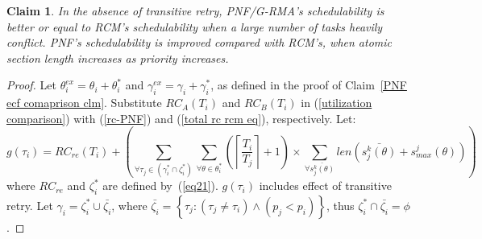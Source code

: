 \documentclass[12pt,english]{report}
\newtheorem{clm}{Claim}
\newtheorem{proof}{Proof}
\begin{document}
\begin{clm}\label{clm_pnf_rcm_comp}
In the absence of transitive retry, PNF/G-RMA's schedulability is better or equal to RCM's schedulability when a large number of tasks heavily conflict. PNF's schedulability is improved compared with RCM's, when atomic section length increases as priority increases. 
\end{clm}
\begin{proof}\normalfont
Let $\theta_{i}^{ex}=\theta_{i}+\theta_{i}^{*}$ and $\gamma_{i}^{ex}=\gamma_{i}+\gamma_{i}^{*}$, as defined in the proof of Claim~\ref{PNF ecf comaprison clm}. Substitute $RC_{A}(T_{i})$ and $RC_{B}(T_{i})$ in (\ref{utilization comparison}) with (\ref{rc-PNF}) and (\ref{total rc rcm eq}), respectively. Let: 
%
\begin{equation*}
g(\tau_{i}) =RC_{re}(T_{i})+\left(\sum_{\forall\tau_{j}\in(\gamma_{i}^{*}\cap\zeta_{i}^{*})}\sum_{\forall\theta\in\theta_{i}^{*}}\left(\left\lceil \frac{T_{i}}{T_{j}}\right\rceil +1\right)\times \sum_{\forall\bar{s_{j}^{k}(\theta)}}len\left(\bar{s_{j}^{k}(\theta)}+s_{max}^{j}(\theta)\right)\right)
\end{equation*}
%
where $RC_{re}$ and $\zeta_i^*$ are defined by~(\ref{eq21}). $g(\tau_i)$ includes effect of transitive retry. 
Let $\gamma_{i}=\zeta_{i}^{*}\cup\bar{\zeta_{i}}$, where $\bar{\zeta_{i}}=\left\{ \tau_{j}:\left(\tau_{j}\ne\tau_{i}\right)\wedge\left(p_{j}<p_{i}\right)\right\} $,
thus $\zeta_{i}^{*}\cap\bar{\zeta_{i}}=\phi$.


\end{proof}
\end{document}
